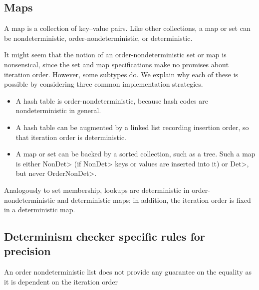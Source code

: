 \subsection{Maps}\label{maps}
A map is a collection of key--value pairs.
Like other collections, a map or set can be nondeterministic,
order-nondeterministic, or deterministic.

It might seem that the notion of an order-nondeterministic set or map is
nonsensical, since the set and map specifications make no promises about
iteration order.  However, some subtypes do.
We explain why each of these is possible by considering three common
implementation strategies.

\begin{itemize}
\item
A hash table is order-nondeterministic, because hash codes are
nondeterministic in general.
\item
A hash table can be augmented by a linked list recording insertion order,
so that iteration order is deterministic.
\item
A map or set can be backed by a sorted collection, such as a tree.  Such a map is
either \<NonDet> (if \<NonDet> keys or values are inserted into it) or
\<Det>, but never \<OrderNonDet>.
\end{itemize}

Analogously to set membership, lookups are deterministic in
order-nondeterministic and deterministic maps; in addition, the iteration
order is fixed in a deterministic map.


\subsection{Determinism checker specific rules for precision}\label{precision}

An order nondeterministic list does not provide any guarantee on the
equality as it is dependent on the iteration order

